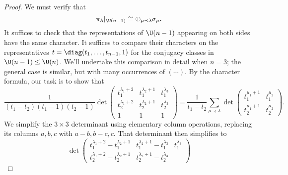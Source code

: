 \documentclass[reqno]{amsart} 
\begin{document}
\begin{proof}
  We must verify that
  \begin{equation}\label{eq:restrict-Un-Unmi1-reps}
    \pi_{\lambda}|_{\U(n-1)}
    \cong
    \oplus_{\mu \prec \lambda}
    \sigma_{\mu}.
  \end{equation}
  It suffices to check that the representations of $\U(n-1)$ appearing on both sides have the same character.  It suffices to compare their characters on the representatives $t = \diag(t_1,\dotsc,t_{n-1},1)$ for the conjugacy classes in $\U(n-1) \leq \U(n)$.  We'll undertake this comparison in detail when $n = 3$; the general case is similar, but with many occurrences of $(\dotsb)$.  By the character formula, our task is to show that
  \begin{equation*}
    \frac{1}{(t_1 - t_2) (t_1 - 1) (t_2 - 1)}
    \det 
    \begin{pmatrix}
      t_1^{\lambda_1 + 2} & t_1^{\lambda_2 + 1} &
                                                  t_1^{\lambda_3} \\
      t_2^{\lambda_1 + 2} & t_2^{\lambda_2 + 1} &
                                                  t_2^{\lambda_3} \\
      1 & 1 & 1      
    \end{pmatrix}
    =
    \frac{1}{t_1 - t_2}
    \sum_{\mu \prec \lambda}
    \det
    \begin{pmatrix}
      t_1^{\mu_1 + 1} & t_1^{\mu_2} \\
      t_2^{\mu_1 + 1} & t_2^{\mu_2}
    \end{pmatrix}
    .
  \end{equation*}
  We simplify the $3 \times 3$ determinant using elementary column operations, replacing its columns $a,b,c$ with $a-b, b-c, c$.  That determinant then simplifies to
  \begin{equation*}
    \det 
\begin{pmatrix}
      t_1^{\lambda_1 + 2} - t_1^{\lambda_2 + 1}
      & t_1^{\lambda_2 + 1} - t_1^{\lambda_3} &
      t_1^{\lambda_3} \\
      t_2^{\lambda_1 + 2} -
      t_2^{\lambda_2 + 1} &
      t_2^{\lambda_2 + 1} - t_2^{\lambda_3}  &

\end{pmatrix}
\end{equation*}
\end{proof}
\end{document}
